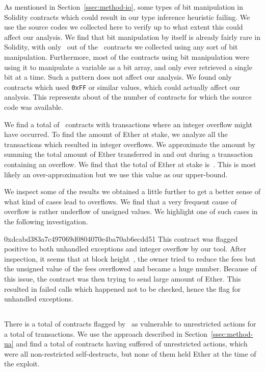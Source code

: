 As mentioned in Section~\ref{ssec:method-io}, some types of bit manipulation in Solidity contracts which could result in our type inference heuristic failing. We use the source codes we collected here to verify up to what extent this could affect our analysis. We find that bit manipulation by itself is already fairly rare in Solidity, with only~ out of the~ contracts we collected using any sort of bit manipulation. Furthermore, most of the contracts using bit manipulation were using it to manipulate a variable as a bit array, and only ever retrieved a single bit at a time. Such a pattern does not affect our analysis. We found only~ contracts which used \lstinline{0xFF} or similar values, which could actually affect our analysis. This represents about  of the number of contracts for which the source code was available.

We find a total of~ contracts with transactions where an integer overflow might have occurred.
To find the amount of Ether at stake, we analyze all the transactions which resulted in integer overflows. We approximate the amount by summing the total amount of Ether transferred in and out during a transaction containing an overflow. We find that the total of Ether at stake is~. This is most likely an over-approximation but we use this value as our upper-bound.

We inspect some of the results we obtained a little further to get a better sense of what kind of cases lead to overflows.
We find that a very frequent cause of overflow is rather underflow of unsigned values.
We highlight one of such cases in the following investigation.

\begin{investigation}{0xdcabd383a7c497069d0804070e4ba70ab6ecdd51}
This contract was flagged positive to both unhandled exceptions and integer overflow by our tool.
%
After inspection, it seems that at block height~, the owner tried to reduce the fees but the unsigned value of the fees overflowed and became a huge number. Because of this issue, the contract was then trying to send large amount of Ether. 
%
This resulted in failed calls which happened not to be checked, hence the flag for unhandled exceptions.
\end{investigation}

\subsection{\unrestrictedaction}
\label{ssec:analysis-ua}
There is a total of  contracts flagged by~\cite{Tsankov2018,Nikolic2018a,Krupp2018} as vulnerable to unrestricted actions for a total of  transactions. We use the approach described in Section~\ref{ssec:method-ua} and find a total of  contracts having suffered of unrestricted actions, which were all non-restricted self-destructs, but none of them held Ether at the time of the exploit.

